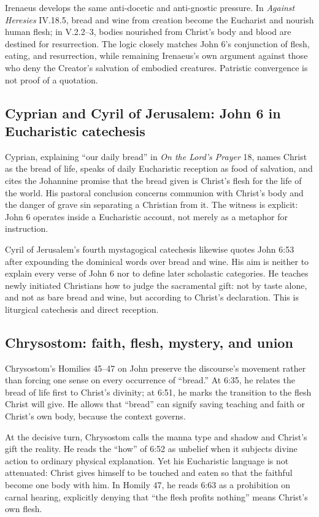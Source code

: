 \begin{deepstudy}
Irenaeus develops the same anti-docetic and anti-gnostic pressure. In
\emph{Against Heresies} IV.18.5, bread and wine from creation become the
Eucharist and nourish human flesh; in V.2.2--3, bodies nourished from Christ's
body and blood are destined for resurrection. The logic closely matches John
6's conjunction of flesh, eating, and resurrection, while remaining Irenaeus's
own argument against those who deny the Creator's salvation of embodied
creatures. Patristic convergence is not proof of a quotation.

\subsection{Cyprian and Cyril of Jerusalem: John 6 in Eucharistic catechesis}

Cyprian, explaining ``our daily bread'' in \emph{On the Lord's Prayer} 18,
names Christ as the bread of life, speaks of daily Eucharistic reception as
food of salvation, and cites the Johannine promise that the bread given is
Christ's flesh for the life of the world. His pastoral conclusion concerns
communion with Christ's body and the danger of grave sin separating a Christian
from it. The witness is explicit: John 6 operates inside a Eucharistic account,
not merely as a metaphor for instruction.

Cyril of Jerusalem's fourth mystagogical catechesis likewise quotes John 6:53
after expounding the dominical words over bread and wine. His aim is neither to
explain every verse of John 6 nor to define later scholastic categories. He
teaches newly initiated Christians how to judge the sacramental gift: not by
taste alone, and not as bare bread and wine, but according to Christ's
declaration. This is liturgical catechesis and direct reception.

\subsection{Chrysostom: faith, flesh, mystery, and union}

Chrysostom's Homilies 45--47 on John preserve the discourse's movement rather
than forcing one sense on every occurrence of ``bread.'' At 6:35, he relates
the bread of life first to Christ's divinity; at 6:51, he marks the transition
to the flesh Christ will give. He allows that ``bread'' can signify saving
teaching and faith or Christ's own body, because the context governs.

At the decisive turn, Chrysostom calls the manna type and shadow and Christ's
gift the reality. He reads the ``how'' of 6:52 as unbelief when it subjects
divine action to ordinary physical explanation. Yet his Eucharistic language
is not attenuated: Christ gives himself to be touched and eaten so that the
faithful become one body with him. In Homily 47, he reads 6:63 as a prohibition
on carnal hearing, explicitly denying that ``the flesh profits nothing'' means
Christ's own flesh.


\end{deepstudy}
